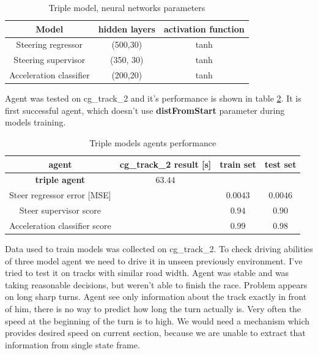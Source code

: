 \documentclass[declaration,shortabstract,english,inz]{iithesis}
\begin{document}
\begin{table}[h]
    \centering
    \begin{tabular}{ |c|c|c|}
          \hline
          Model & hidden layers & activation function \\
          \hline
          Steering regressor & (500,30) &  tanh  \\
          \hline
          Steering supervisor &  (350, 30) & tanh \\
          \hline
          Acceleration classifier & (200,20) & tanh \\
          \hline
        \end{tabular}
        \caption{Triple model, neural networks parameters}
        \label{tab:triple_models_nn_params}
\end{table}

Agent was tested on cg\_track\_2 and it's performance is shown in table \ref{tab:triple_models_results}.
It is first successful agent, which doesn't use \textbf{distFromStart} parameter during models training.



 \begin{table}[h]
    \centering
    \begin{tabular}{ |c|c|c|c|}
          \hline
          agent & cg\_track\_2 result [s] & train set & test set \\
          \hline
          \textbf{triple agent} & $63.44$ &   &  \\
          \hline
          Steer regressor error [MSE]&   & $0.0043$ & $0.0046$\\
          \hline
          Steer supervisor score & & $0.94$ & $0.90$ \\
          \hline
          Acceleration classifier score &  & $0.99$ & $0.98$ \\
          \hline       
        \end{tabular}
        \caption{Triple models agents performance}
        \label{tab:triple_models_results}

\end{table}

Data used to train models was collected on cg\_track\_2.
To check driving abilities of three model agent we need to drive it in unseen previously environment.
I've tried to test it on tracks with similar road width.
Agent was stable and was taking reasonable decisions, but weren't able to finish the race.
Problem appears on long sharp turns.
Agent see only information about the track exactly in front of him, there is no way to predict how long the turn actually is.
Very often the speed at the beginning of the turn is to high.
We would need a mechanism which provides desired speed on current section, because we are unable to extract that information from single state frame.
\end{document}
